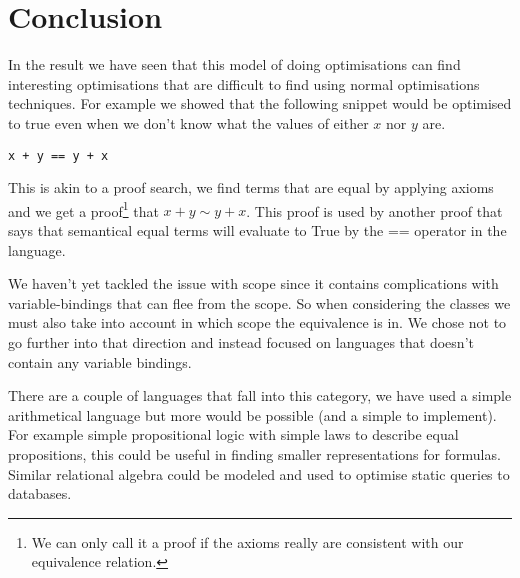 
\section{Conclusion}
In the result we have seen that this model of doing optimisations can find interesting
optimisations that are difficult to find using normal optimisations techniques.
For example we showed that the following snippet would be optimised to true even
when we don't know what the values of either $x$ nor $y$ are.

\begin{verbatim}
x + y == y + x
\end{verbatim}

This is akin to a proof search, we find terms that are equal by applying axioms
and we get a proof\footnote{We can only call it a proof if the axioms really are 
consistent with our equivalence relation.} that $x + y \sim y + x$. This proof
is used by another proof that says that semantical equal terms will evaluate to 
True by the == operator in the language.

We haven't yet tackled the issue with scope since it contains complications
with variable-bindings that can flee from the scope. So when considering the classes
we must also take into account in which scope the equivalence is in. We chose not
to go further into that direction and instead focused on languages that doesn't
contain any variable bindings.

There are a couple of languages that fall into this category, we have used a simple
arithmetical language but more would be possible (and a simple to implement). For
example simple propositional logic with simple laws to describe equal propositions,
this could be useful in finding smaller representations for formulas. Similar
relational algebra could be modeled and used to optimise static queries to databases.

 